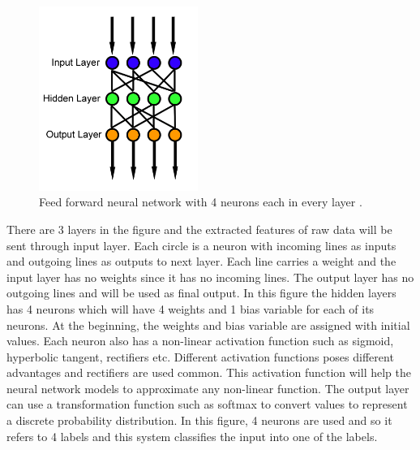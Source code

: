 \documentclass[a4paper, 11pt]{article}
\begin{document}
\begin{figure}[htpb]
    \centering
    \includegraphics[height=6cm,keepaspectratio=true]
    {Feed_forward_neural_net.png}
    \caption{
        Feed forward neural network with 4 neurons each in every layer \cite{WikipediaEN_FeedForward_Network}.
    }
    \label{fig:Feed forward neural network}
\end{figure}

There are 3 layers in the figure and the extracted features of raw data will be sent through input layer. Each circle is a neuron with incoming lines as inputs and outgoing lines as outputs to next layer. Each line carries a weight and the input layer has no weights since it has no incoming lines. The output layer has no outgoing lines and will be used as final output. In this figure the hidden layers has 4 neurons which will have 4 weights and 1 bias variable for each of its neurons. At the beginning, the weights and bias variable are assigned with initial values. Each neuron also has a non-linear activation function such as sigmoid, hyperbolic tangent, rectifiers etc. Different activation functions poses different advantages and rectifiers are used common. This activation function will help the neural network models to approximate any non-linear function. The output layer can use a transformation function such as softmax to convert values to represent a discrete probability distribution. In this figure, 4 neurons are used and so it refers to 4 labels and this system classifies the input into one of the labels.
\end{document}
